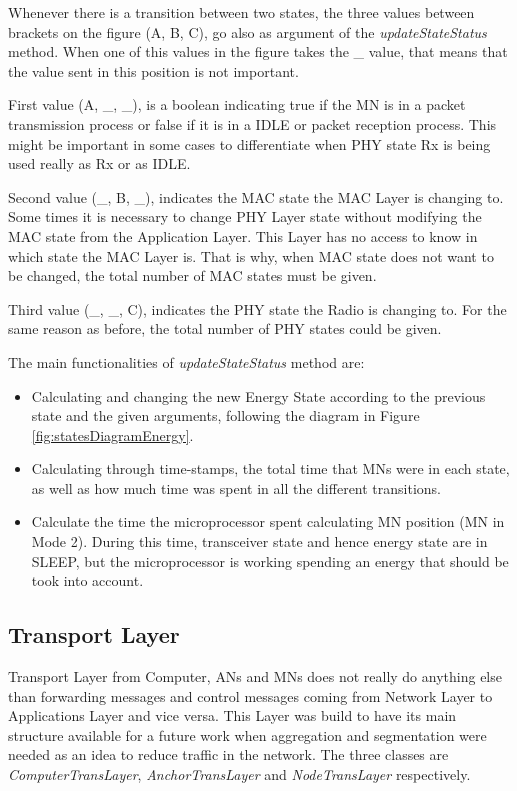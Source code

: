 Whenever there is a transition between two states, the three values between brackets on the figure (A, B, C), go also as argument of the 
\textit{updateStateStatus} method. When one of this values in the figure takes the \_ value, that means that the value sent
in this position is not important.

First value (A, \_, \_), is a boolean indicating true if the \ac{MN} is in a packet transmission process or false if it is in a IDLE or packet 
reception process. This might be important in some cases to differentiate when \ac{PHY} state \ac{Rx} is being used really as \ac{Rx} or as
IDLE.

Second value (\_, B, \_), indicates the \ac{MAC} state the \ac{MAC} Layer is changing to. Some times it is necessary to change \ac{PHY} Layer state
without modifying the \ac{MAC} state from the Application Layer. This Layer has no access to know in which state the \ac{MAC} Layer is. That is
why, when \ac{MAC} state does not want to be changed, the total number of \ac{MAC} states must be given.

Third value (\_, \_, C), indicates the \ac{PHY} state the Radio is changing to. For the same reason as before, the total number of \ac{PHY} states
could be given.

The main functionalities of \textit{updateStateStatus} method are:
\begin{itemize}
 \item Calculating and changing the new Energy State according to the previous state and the given arguments, following the diagram in Figure
\ref{fig:statesDiagramEnergy}.
 \item Calculating through time-stamps, the total time that \acp{MN} were in each state, as well as how much time was spent in all the different
transitions.
 \item Calculate the time the microprocessor spent calculating \ac{MN} position (\ac{MN} in Mode 2). During this time, transceiver
state and hence energy state are in SLEEP, but the microprocessor is working spending an energy that should be took into account.
\end{itemize}

\subsection{Transport Layer}

Transport Layer from Computer, \acp{AN} and \acp{MN} does not really do anything else than forwarding messages and control messages coming from 
Network Layer to Applications Layer and vice versa. This Layer was build to have its main structure available for a future work when 
aggregation and segmentation were needed as an idea to reduce traffic in the network. The three classes are \textit{ComputerTransLayer},
\textit{AnchorTransLayer} and \textit{NodeTransLayer} respectively.

